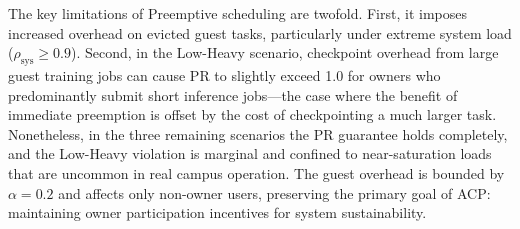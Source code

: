 
The key limitations of Preemptive scheduling are twofold.
First, it imposes increased overhead on evicted guest tasks,
particularly under extreme system load ($\rho_\mathrm{sys} \geq 0.9$).
Second, in the Low-Heavy scenario, checkpoint overhead from large guest
training jobs can cause PR to slightly exceed 1.0 for owners who
predominantly submit short inference jobs---the case where the benefit of
immediate preemption is offset by the cost of checkpointing a much larger task.
Nonetheless, in the three remaining scenarios the PR guarantee holds completely,
and the Low-Heavy violation is marginal and confined to near-saturation loads
that are uncommon in real campus operation.
The guest overhead is bounded by $\alpha = 0.2$
and affects only non-owner users, preserving the primary goal of ACP:
maintaining owner participation incentives for system sustainability.

